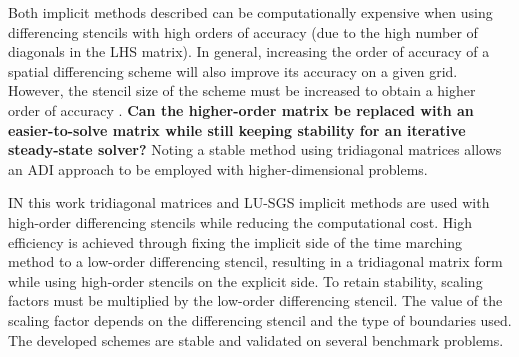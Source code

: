 \documentclass[conf]{new-aiaa}
\begin{document}
Both implicit methods described can be computationally expensive when using differencing stencils with high orders of accuracy (due to the high number of diagonals in the LHS matrix). 
In general, increasing the order of accuracy of a spatial differencing scheme will also improve its accuracy on a given grid. 
However, the stencil size of the scheme must be increased to obtain a higher order of accuracy \cite{RDRP}. 
\textbf{Can the higher-order matrix be replaced with an easier-to-solve matrix
while still keeping stability for an iterative steady-state solver?} 
Noting a stable method using tridiagonal matrices allows an ADI approach to be employed with higher-dimensional problems. 

IN this work tridiagonal matrices and LU-SGS implicit methods are used with high-order differencing stencils while reducing the computational cost. 
High efficiency is achieved through fixing the implicit side of the time marching method to a low-order differencing stencil, resulting in a tridiagonal matrix form while using high-order stencils on the explicit side. 
To retain stability, scaling factors must be multiplied by the low-order differencing stencil.
The value of the scaling factor depends on the differencing stencil and the type of boundaries used. 
The developed schemes are stable and validated on several benchmark problems. 
\end{document}
